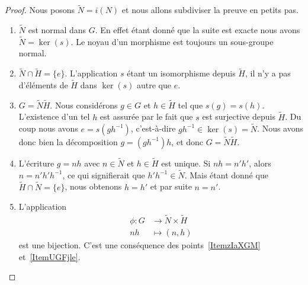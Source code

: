 \begin{proof}
	Nous posons \( \tilde N=i(N)\) et nous allons subdiviser la preuve en petits pas.

	\begin{enumerate}
		\item \( \tilde N\) est normal dans \( G\). En effet étant donné que la suite est exacte nous avons \( \tilde N=\ker(s)\). Le noyau d'un morphisme est toujours un sous-groupe normal.

		\item \( \tilde N\cap\tilde H=\{ e \}\). L'application \( s\) étant un isomorphisme depuis $\tilde H$, il n'y a pas d'éléments de \( \tilde H\) dans \( \ker(s)\) autre que $e$.

		\item   \label{ItemzIaXGM} \( G=\tilde N\tilde H\). Nous considérons \( g\in G\) et \( h\in \tilde H\) tel que \( s(g)=s(h)\). L'existence d'un tel \( h\) est assurée par le fait que \( s\) est surjective depuis \( \tilde H\). Du coup nous avons \( e=s(gh^{-1})\), c'est-à-dire \( gh^{-1}\in \ker (s)=\tilde N\). Nous avons donc bien la décomposition \( g=(gh^{-1})h\), et donc \( G=\tilde N\tilde H\).

		\item   \label{ItemUGFjle} L'écriture \( g=nh\) avec \( n\in \tilde N\) et \( h\in \tilde H\) est unique. Si \( nh=n'h'\), alors \( n=n'h'h^{-1}\), ce qui signifierait que \( h'h^{-1}\in\tilde N\). Mais étant donné que \( \tilde H\cap\tilde N=\{ e \}\), nous obtenons \( h=h'\) et par suite \( n=n'\).

		\item   \label{ItemUZlrKo}
		      L'application
		      \begin{equation}
			      \begin{aligned}
				      \phi\colon G & \to \tilde N\times \tilde H \\
				      nh           & \mapsto (n,h)
			      \end{aligned}
		      \end{equation}
		      est une bijection. C'est une conséquence des points~\ref{ItemzIaXGM} et~\ref{ItemUGFjle}.


\end{enumerate}
\end{proof}
